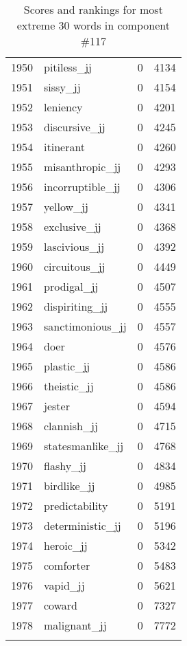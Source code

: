 \begin{longtable}[!htbp]{| rlr@{.}l |}
    1950 & pitiless\_jj & 0 & 4134 \\
    1951 & sissy\_jj & 0 & 4154 \\
    1952 & leniency & 0 & 4201 \\
    1953 & discursive\_jj & 0 & 4245 \\
    1954 & itinerant & 0 & 4260 \\
    1955 & misanthropic\_jj & 0 & 4293 \\
    1956 & incorruptible\_jj & 0 & 4306 \\
    1957 & yellow\_jj & 0 & 4341 \\
    1958 & exclusive\_jj & 0 & 4368 \\
    1959 & lascivious\_jj & 0 & 4392 \\
    1960 & circuitous\_jj & 0 & 4449 \\
    1961 & prodigal\_jj & 0 & 4507 \\
    1962 & dispiriting\_jj & 0 & 4555 \\
    1963 & sanctimonious\_jj & 0 & 4557 \\
    1964 & doer & 0 & 4576 \\
    1965 & plastic\_jj & 0 & 4586 \\
    1966 & theistic\_jj & 0 & 4586 \\
    1967 & jester & 0 & 4594 \\
    1968 & clannish\_jj & 0 & 4715 \\
    1969 & statesmanlike\_jj & 0 & 4768 \\
    1970 & flashy\_jj & 0 & 4834 \\
    1971 & birdlike\_jj & 0 & 4985 \\
    1972 & predictability & 0 & 5191 \\
    1973 & deterministic\_jj & 0 & 5196 \\
    1974 & heroic\_jj & 0 & 5342 \\
    1975 & comforter & 0 & 5483 \\
    1976 & vapid\_jj & 0 & 5621 \\
    1977 & coward & 0 & 7327 \\
    1978 & malignant\_jj & 0 & 7772 \\
    \hline
    \caption{Scores and rankings for most extreme 30 words in component \#117} \\
\end{longtable}
